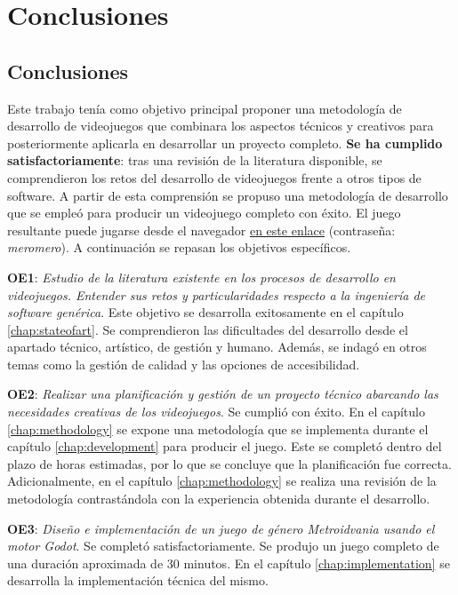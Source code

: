 \chapter{Conclusiones}

\section{Conclusiones}

Este trabajo tenía como objetivo principal proponer una metodología de desarrollo de videojuegos que combinara los aspectos técnicos y creativos para posteriormente aplicarla en desarrollar un proyecto completo. \textbf{Se ha cumplido satisfactoriamente}: tras una revisión de la literatura disponible, se comprendieron los retos del desarrollo de videojuegos frente a otros tipos de software. A partir de esta comprensión se propuso una metodología de desarrollo que se empleó para producir un videojuego completo con éxito. El juego resultante puede jugarse desde el navegador \href{https://pavro-o.itch.io/mero-mero}{en este enlace} (contraseña: \textit{meromero}). A continuación se repasan los objetivos específicos.

\textbf{OE1}: \textit{Estudio de la literatura existente en los procesos de desarrollo en videojuegos. Entender sus retos y particularidades respecto a la ingeniería de software genérica}. Este objetivo se desarrolla exitosamente en el capítulo \ref{chap:stateofart}. Se comprendieron las dificultades del desarrollo desde el apartado técnico, artístico, de gestión y humano. Además, se indagó en otros temas como la gestión de calidad y las opciones de accesibilidad.

\textbf{OE2}: \textit{Realizar una planificación y gestión de un proyecto técnico abarcando las necesidades creativas de los videojuegos}. Se cumplió con éxito. En el capítulo \ref{chap:methodology} se expone una metodología que se implementa durante el capítulo \ref{chap:development} para producir el juego. Este se completó dentro del plazo de horas estimadas, por lo que se concluye que la planificación fue correcta. Adicionalmente, en el capítulo \ref{chap:methodology} se realiza una revisión de la metodología contrastándola con la experiencia obtenida durante el desarrollo.

\textbf{OE3}: \textit{Diseño e implementación de un juego de género Metroidvania usando el motor \textit{Godot}}. Se completó satisfactoriamente. Se produjo un juego completo de una duración aproximada de 30 minutos. En el capítulo \ref{chap:implementation} se desarrolla la implementación técnica del mismo.

